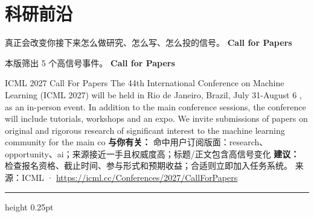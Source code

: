 \documentclass[10.5pt]{ctexart}
\begin{document}
\section*{科研前沿}
{\color{ormuted} 真正会改变你接下来怎么做研究、怎么写、怎么投的信号。}
\vspace{2mm}
{\LARGE\bfseries Call for Papers}\par
\vspace{1mm}
{\color{ormuted} 本版筛出 5 个高信号事件。}
\vspace{3mm}
{\Large\bfseries Call for Papers}\par
ICML 2027 Call For Papers The 44th International Conference on Machine Learning (ICML 2027) will be held in Rio de Janeiro, Brazil, July 31-August 6 , as an in-person event. In addition to the main conference sessions, the conference will include tutorials, workshops and an expo. We invite submissions of papers on original and rigorous research of significant interest to the machine learning community for the main co
\textbf{与你有关：} 命中用户订阅版面：research、opportunity、ai；来源接近一手且权威度高；标题/正文包含高信号变化
\textbf{建议：} 检查报名资格、截止时间、参与形式和预期收益；合适则立即加入任务系统。
{\footnotesize\color{ormuted} 来源：ICML · \url{https://icml.cc/Conferences/2027/CallForPapers}}
\vspace{4mm}
\hrule height 0.25pt
\vspace{3mm}
\end{document}
